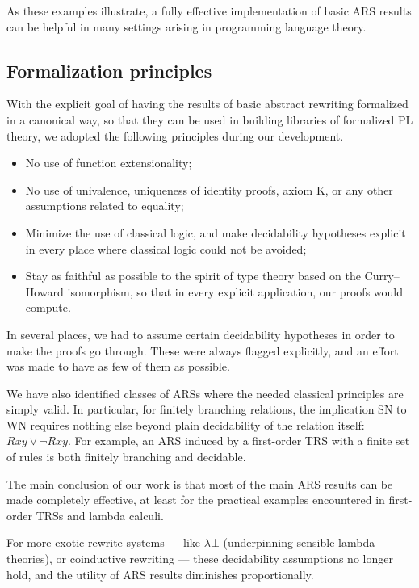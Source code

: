 As these examples illustrate, a fully effective implementation of basic ARS results
can be helpful in many settings arising in programming language theory.

\subsection{Formalization principles}
With the explicit goal of having the results of basic abstract rewriting
formalized in a canonical way, so that they can be used in building
libraries of formalized PL theory, we adopted the following
principles during our development.

\begin{itemize}
  \item No use of function extensionality;
  \item No use of univalence, uniqueness of identity proofs, axiom K, or any other
  assumptions related to equality;
  \item Minimize the use of classical logic, and make decidability hypotheses explicit in every place where classical logic could not be avoided;
  \item Stay as faithful as possible to the spirit of type theory based on the Curry--Howard isomorphism, so that in every explicit application, our proofs would compute.
\end{itemize}

In several places, we had to assume certain decidability hypotheses in order to make
the proofs go through.  These were always flagged explicitly, and an effort was made to
have as few of them as possible.

We have also identified classes of ARSs where the needed classical principles are simply valid.  In particular, for finitely branching relations, the implication SN to WN requires nothing else beyond plain decidability of the relation itself: $Rxy \lor \lnot Rxy$.  For example, an ARS induced by a first-order TRS with a finite set of rules is both finitely branching and decidable.

The main conclusion of our work is that most of the main ARS results can be made completely effective, at least for the practical examples encountered in first-order TRSs and lambda calculi.

For more exotic rewrite systems --- like $\lambda \bot$ (underpinning sensible lambda theories), or coinductive rewriting ---
these decidability assumptions no longer hold, and the utility of ARS results diminishes proportionally.

